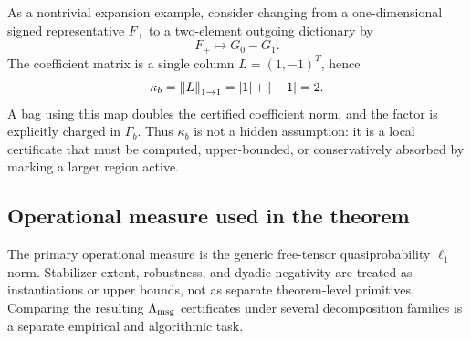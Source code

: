 As a nontrivial expansion example, consider changing from a one-dimensional signed representative \(F_+\) to a two-element outgoing dictionary by
\[
F_+\longmapsto G_0-G_1 .
\]
The coefficient matrix is a single column \(L=(1,-1)^T\), hence
\[
\kappa_b=\left\lVert L \right\rVert_{1\to1}=|1|+|-1|=2 .
\]
A bag using this map doubles the certified coefficient norm, and the factor is explicitly charged in \(\Gamma_b\). Thus \(\kappa_b\) is not a hidden assumption: it is a local certificate that must be computed, upper-bounded, or conservatively absorbed by marking a larger region active.

\subsection{Operational measure used in the theorem}

The primary operational measure is the generic free-tensor quasiprobability \(\ell_1\) norm. Stabilizer extent, robustness, and dyadic negativity are treated as instantiations or upper bounds, not as separate theorem-level primitives. Comparing the resulting \(\Lambda_{\mathrm{msg}}\) certificates under several decomposition families is a separate empirical and algorithmic task.
